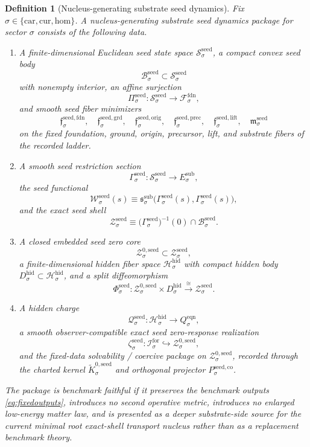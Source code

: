 \documentclass[11pt]{article}
\newcommand{\Car}{\mathrm{car}}
\newcommand{\Cur}{\mathrm{cur}}
\newcommand{\Hom}{\mathrm{hom}}
\newcommand{\ForSpace}[1]{\mathcal I_{#1}^{\mathrm{for}}}
\newcommand{\EqnTarget}[1]{Q_{#1}^{\mathrm{eqn}}}
\newcommand{\FoundSpace}[1]{\mathcal F_{#1}^{\mathrm{fdn}}}
\newcommand{\SubTarget}[1]{E_{#1}^{\mathrm{sub}}}
\newcommand{\SubPair}[1]{\mathfrak s_{#1}^{\mathrm{sub}}}
\newcommand{\HiddenSpace}[1]{\mathcal H_{#1}^{\mathrm{hid}}}
\newcommand{\HiddenBody}[1]{D_{#1}^{\mathrm{hid}}}
\newcommand{\SeedSpace}[1]{\mathcal S_{#1}^{\mathrm{seed}}}
\newcommand{\SeedBody}[1]{\mathcal B_{#1}^{\mathrm{seed}}}
\newcommand{\SeedProj}[1]{\Pi_{#1}^{\mathrm{seed}}}
\newcommand{\SeedFoundMin}[1]{\mathfrak f_{#1}^{\mathrm{seed,fdn}}}
\newcommand{\SeedGroundMin}[1]{\mathfrak f_{#1}^{\mathrm{seed,grd}}}
\newcommand{\SeedOrigMin}[1]{\mathfrak f_{#1}^{\mathrm{seed,orig}}}
\newcommand{\SeedPrecMin}[1]{\mathfrak f_{#1}^{\mathrm{seed,prec}}}
\newcommand{\SeedLiftMin}[1]{\mathfrak f_{#1}^{\mathrm{seed,lift}}}
\newcommand{\SeedSubMin}[1]{\mathfrak m_{#1}^{\mathrm{seed}}}
\newcommand{\SeedSection}[1]{\Gamma_{#1}^{\mathrm{seed}}}
\newcommand{\SeedFunctional}[1]{\mathscr W_{#1}^{\mathrm{seed}}}
\newcommand{\SeedShellSet}[1]{\mathcal Z_{#1}^{\mathrm{seed}}}
\newcommand{\SeedZeroCore}[1]{\mathcal Z_{#1}^{0,\mathrm{seed}}}
\newcommand{\SeedSplit}[1]{\Phi_{#1}^{\mathrm{seed}}}
\newcommand{\SeedCharge}[1]{\mathcal Q_{#1}^{\mathrm{seed}}}
\newcommand{\SeedEmbed}[1]{\zeta_{#1}^{\mathrm{seed}}}
\newcommand{\SeedKernelCh}[1]{\widetilde K_{#1}^{0,\mathrm{seed}}}
\newcommand{\SeedStateComp}[1]{P_{#1}^{\mathrm{seed,co}}}
\newtheorem{definition}{Definition}
\begin{document}
\begin{definition}[Nucleus-generating substrate seed dynamics]
\label{def:seed}
Fix \(\sigma\in\{\Car,\Cur,\Hom\}\). A \emph{nucleus-generating substrate seed dynamics package} for sector \(\sigma\) consists of the following data.
\begin{enumerate}
    \item A finite-dimensional Euclidean seed state space \(\SeedSpace{\sigma}\), a compact convex seed body
    \[
    \SeedBody{\sigma}\subset\SeedSpace{\sigma}
    \]
    with nonempty interior, an affine surjection
    \[
    \SeedProj{\sigma}:\SeedSpace{\sigma}\to\FoundSpace{\sigma},
    \]
    and smooth seed fiber minimizers
    \[
    \SeedFoundMin{\sigma},\quad
    \SeedGroundMin{\sigma},\quad
    \SeedOrigMin{\sigma},\quad
    \SeedPrecMin{\sigma},\quad
    \SeedLiftMin{\sigma},\quad
    \SeedSubMin{\sigma}
    \]
    on the fixed foundation, ground, origin, precursor, lift, and substrate fibers of the recorded ladder.
    \item A smooth seed restriction section
    \[
    \SeedSection{\sigma}:\SeedSpace{\sigma}\to\SubTarget{\sigma},
    \]
    the seed functional
    \[
    \SeedFunctional{\sigma}(s)
    \equiv
    \SubPair{\sigma}\bigl(\SeedSection{\sigma}(s),\SeedSection{\sigma}(s)\bigr),
    \]
    and the exact seed shell
    \[
    \SeedShellSet{\sigma}
    \equiv
    \bigl(\SeedSection{\sigma}\bigr)^{-1}(0)\cap\SeedBody{\sigma}.
    \]
    \item A closed embedded seed zero core
    \[
    \SeedZeroCore{\sigma}\subset\SeedShellSet{\sigma},
    \]
    a finite-dimensional hidden fiber space \(\HiddenSpace{\sigma}\) with compact hidden body \(\HiddenBody{\sigma}\subset\HiddenSpace{\sigma}\), and a split diffeomorphism
    \[
    \SeedSplit{\sigma}:
    \SeedZeroCore{\sigma}\times\HiddenBody{\sigma}
    \xrightarrow{\cong}
    \SeedShellSet{\sigma}.
    \]
    \item A hidden charge
    \[
    \SeedCharge{\sigma}:\HiddenSpace{\sigma}\to\EqnTarget{\sigma},
    \]
    a smooth observer-compatible exact seed zero-response realization
    \[
    \SeedEmbed{\sigma}:\ForSpace{\sigma}\hookrightarrow\SeedZeroCore{\sigma},
    \]
    and the fixed-data solvability / coercive package on \(\SeedZeroCore{\sigma}\), recorded through the charted kernel \(\SeedKernelCh{\sigma}\) and orthogonal projector \(\SeedStateComp{\sigma}\).
\end{enumerate}
The package is \emph{benchmark faithful} if it preserves the benchmark outputs \eqref{eq:fixedoutputs}, introduces no second operative metric, introduces no enlarged low-energy matter law, and is presented as a deeper substrate-side source for the current minimal root exact-shell transport nucleus rather than as a replacement benchmark theory.
\end{definition}
\end{document}

